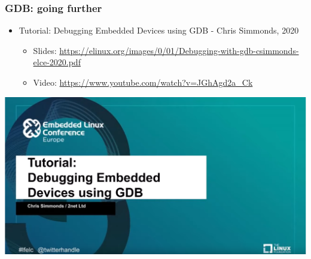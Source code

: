 \begin{frame}
  \frametitle{GDB: going further}
  \begin{itemize}
    \item Tutorial: Debugging Embedded Devices using GDB - Chris Simmonds, 2020
    \begin{itemize}
      \item Slides: \url{https://elinux.org/images/0/01/Debugging-with-gdb-csimmonds-elce-2020.pdf}
      \item Video: \url{https://www.youtube.com/watch?v=JGhAgd2a_Ck}
    \end{itemize}
  \end{itemize}
  \begin{center}
    \includegraphics[height=0.6\textheight]{slides/debugging-application-debugging/gdb_tuto_elce_2020.png}
  \end{center}
\end{frame}


